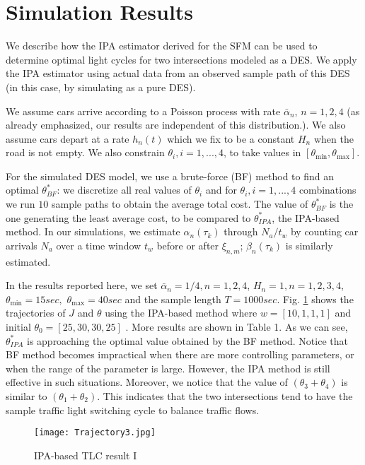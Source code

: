 \documentclass{ifacconf}\usepackage{graphicx}
\begin{document}
\section{Simulation Results}


We describe how the IPA estimator derived for the SFM can be used to determine
optimal light cycles for two intersections modeled as a DES. We apply the IPA
estimator using actual data from an observed sample path of this DES (in this
case, by simulating as a pure DES).

We assume cars arrive according to a Poisson process with rate $\bar{\alpha
}_{n}$, $n=1,2,4$ (as already emphasized, our results are independent of this
distribution.). We also assume cars depart at a rate $h_{n}(t)$ which we fix
to be a constant $H_{n}$ when the road is not empty. We also constrain $\theta_{i},i=1,...,4$, to
take values in $[\theta_{\min},\theta_{\max}]$.

For the simulated DES model, we use a brute-force (BF) method to find an
optimal $\theta_{BF}^{\ast}$: we discretize all real values of $\theta_{i}$
and for $\theta_{i}, i=1,...,4$ combinations we run $10$ sample paths
to obtain the average total cost. The value of $\theta_{BF}^{\ast}$ is the one
generating the least average cost, to be compared to $\theta_{IPA}^{\ast}$,
the IPA-based method. In our simulations, we estimate $\alpha_{n}(\tau_{k})$ through ${N_{a}}/{t_{w}}$ by
counting car arrivals $N_{a}$ over a time window $t_{w}$ before or after
$\xi_{n,m}$; $\beta_{n}(\tau_{k})$ is similarly estimated.

In the results reported here, we set $\bar{\alpha}_{n}=1/4,n=1,2,4$,
$H_{n}=1,n=1,2,3,4$,  $\theta_{\min}=15sec,$ $\theta_{\max
}=40sec$ and the sample length $T=1000sec$. Fig. \ref{Trajectory} shows the trajectories of $J$ and
$\theta$ using the IPA-based method where $w=[10,1,1,1]$ and initial $\theta_0=[25,30,30,25]$ . More results are
shown in Table 1. As we can see, $\theta_{IPA}^{\ast}$ is approaching the
optimal value obtained by the BF method. Notice that BF method becomes
impractical when there are more controlling parameters, or when the range of
the parameter is large. However, the IPA method is still effective in such
situations. Moreover, we notice that the value of $(\theta_3+\theta_4)$ is similar to $(\theta_1+\theta_2)$. This indicates that the two intersections tend to have the sample traffic light switching cycle to balance traffic flows.

\begin{figure}[tbh]
\centering
\texttt{[image: Trajectory3.jpg]}\caption{IPA-based TLC result I }\label{Trajectory}\end{figure}
\end{document}

